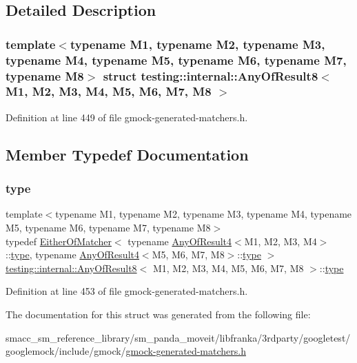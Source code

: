 \subsection{Detailed Description}
\subsubsection*{template$<$typename M1, typename M2, typename M3, typename M4, typename M5, typename M6, typename M7, typename M8$>$\newline
struct testing\+::internal\+::\+Any\+Of\+Result8$<$ M1, M2, M3, M4, M5, M6, M7, M8 $>$}



Definition at line 449 of file gmock-\/generated-\/matchers.\+h.



\subsection{Member Typedef Documentation}
\mbox{\label{structtesting_1_1internal_1_1AnyOfResult8_a8f8a1e78a019965c24bd22c78885747d}} 
\subsubsection{\texorpdfstring{type}{type}}
{\footnotesize\ttfamily template$<$typename M1, typename M2, typename M3, typename M4, typename M5, typename M6, typename M7, typename M8$>$ \\
typedef \hyperlink{classtesting_1_1internal_1_1EitherOfMatcher}{Either\+Of\+Matcher}$<$ typename \hyperlink{structtesting_1_1internal_1_1AnyOfResult4}{Any\+Of\+Result4}$<$M1, M2, M3, M4$>$\+::\hyperlink{structtesting_1_1internal_1_1AnyOfResult8_a8f8a1e78a019965c24bd22c78885747d}{type}, typename \hyperlink{structtesting_1_1internal_1_1AnyOfResult4}{Any\+Of\+Result4}$<$M5, M6, M7, M8$>$\+::\hyperlink{structtesting_1_1internal_1_1AnyOfResult8_a8f8a1e78a019965c24bd22c78885747d}{type} $>$ \hyperlink{structtesting_1_1internal_1_1AnyOfResult8}{testing\+::internal\+::\+Any\+Of\+Result8}$<$ M1, M2, M3, M4, M5, M6, M7, M8 $>$\+::\hyperlink{structtesting_1_1internal_1_1AnyOfResult8_a8f8a1e78a019965c24bd22c78885747d}{type}}



Definition at line 453 of file gmock-\/generated-\/matchers.\+h.



The documentation for this struct was generated from the following file\+:\begin{DoxyCompactItemize}
\item 
smacc\+\_\+sm\+\_\+reference\+\_\+library/sm\+\_\+panda\+\_\+moveit/libfranka/3rdparty/googletest/googlemock/include/gmock/\hyperlink{gmock-generated-matchers_8h}{gmock-\/generated-\/matchers.\+h}\end{DoxyCompactItemize}
